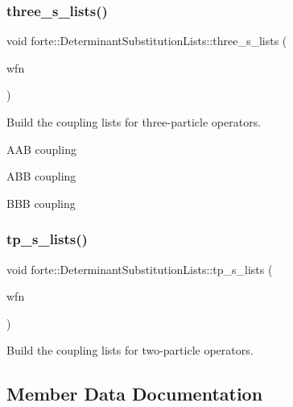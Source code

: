 \subsubsection{\texorpdfstring{three\+\_\+s\+\_\+lists()}{three\_s\_lists()}}
{\footnotesize\ttfamily void forte\+::\+Determinant\+Substitution\+Lists\+::three\+\_\+s\+\_\+lists (\begin{DoxyParamCaption}\item[{const \mbox{\hyperlink{classforte_1_1_determinant_hash_vec}{Determinant\+Hash\+Vec}} \&}]{wfn }\end{DoxyParamCaption})}



Build the coupling lists for three-\/particle operators. 

A\+AB coupling

A\+BB coupling

B\+BB coupling \mbox{\label{classforte_1_1_determinant_substitution_lists_afbcf9837fbd1f0ba05c2959853896c00}} 
\subsubsection{\texorpdfstring{tp\+\_\+s\+\_\+lists()}{tp\_s\_lists()}}
{\footnotesize\ttfamily void forte\+::\+Determinant\+Substitution\+Lists\+::tp\+\_\+s\+\_\+lists (\begin{DoxyParamCaption}\item[{const \mbox{\hyperlink{classforte_1_1_determinant_hash_vec}{Determinant\+Hash\+Vec}} \&}]{wfn }\end{DoxyParamCaption})}



Build the coupling lists for two-\/particle operators. 



\subsection{Member Data Documentation}
\mbox{\label{classforte_1_1_determinant_substitution_lists_a5c532b82288f789be57dce094e465b3e}} 
